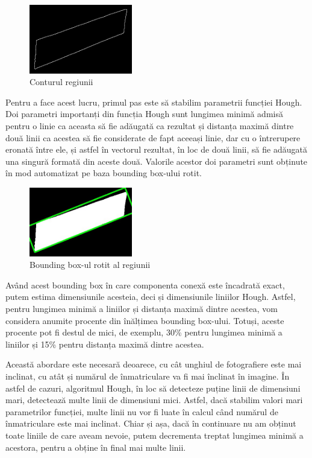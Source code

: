 \documentclass[a4paper,12pt]{report}
\begin{document}
\begin{figure}[h!]
    \centering
    \includegraphics[width=0.4\textwidth]{images/edges.jpg}
    \caption{Conturul regiunii}
\end{figure}
\FloatBarrier

Pentru a face acest lucru, primul pas este să stabilim parametrii funcției Hough. Doi parametri importanți din funcția Hough sunt lungimea minimă admisă pentru o linie ca aceasta să fie adăugată ca rezultat și distanța maximă dintre două linii ca acestea să fie considerate de fapt aceeași linie, dar cu o întrerupere eronată între ele, și astfel în vectorul rezultat, în loc de două linii, să fie adăugată una singură formată din aceste două. Valorile acestor doi parametri sunt obținute în mod automatizat pe baza bounding box-ului rotit.

\begin{figure}[h!]
    \centering
    \includegraphics[width=0.4\textwidth]{images/rotated_rect.jpg}
    \caption{Bounding box-ul rotit al regiunii}
\end{figure}
\FloatBarrier

Având acest bounding box în care componenta conexă este încadrată exact, putem estima dimensiunile acesteia, deci și dimensiunile liniilor Hough. Astfel, pentru lungimea minimă a liniilor și distanța maximă dintre acestea, vom considera anumite procente din înălțimea bounding box-ului. Totuși, aceste procente pot fi destul de mici, de exemplu, 30\% pentru lungimea minimă a liniilor și 15\% pentru distanța maximă dintre acestea.

Această abordare este necesară deoarece, cu cât unghiul de fotografiere este mai inclinat, cu atât și numărul de înmatriculare va fi mai înclinat în imagine. În astfel de cazuri, algoritmul Hough, în loc să detecteze puține linii de dimensiuni mari, detectează multe linii de dimensiuni mici. Astfel, dacă stabilim valori mari parametrilor funcției, multe linii nu vor fi luate în calcul când numărul de înmatriculare este mai inclinat. Chiar și așa, dacă în continuare nu am obținut toate liniile de care aveam nevoie, putem decrementa treptat lungimea minimă a acestora, pentru a obține în final mai multe linii.
\end{document}

